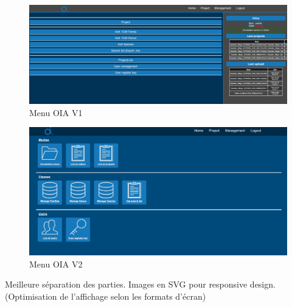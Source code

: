\documentclass[12pt]{article}
\begin{document}
\begin{figure}[H]
\centering
\includegraphics[width=1\textwidth]{img/OIA_V1/oia_v1_01.png}
 \caption{Menu OIA V1}
 \label{fig:menu_v1}
\end{figure}
\begin{figure}[H]
\centering
\includegraphics[width=1\textwidth]{img/OIA_V2/oia_v2_01.png}
 \caption{Menu OIA V2}
 \label{fig:menu_v2}
\end{figure}

Meilleure séparation des parties. Images en SVG pour responsive design.
(Optimisation de l'affichage selon les formats d'écran)
\end{document}
